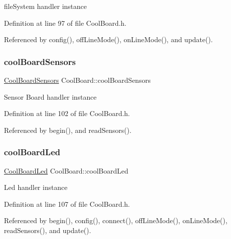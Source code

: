 file\+System handler instance 

Definition at line 97 of file Cool\+Board.\+h.



Referenced by config(), off\+Line\+Mode(), on\+Line\+Mode(), and update().

\mbox{\label{class_cool_board_af102be5288bd7f7a8e59b13f86e26a00}} 
\subsubsection{\texorpdfstring{cool\+Board\+Sensors}{coolBoardSensors}}
{\footnotesize\ttfamily \hyperlink{class_cool_board_sensors}{Cool\+Board\+Sensors} Cool\+Board\+::cool\+Board\+Sensors\hspace{0.3cm}{\ttfamily [private]}}

Sensor Board handler instance 

Definition at line 102 of file Cool\+Board.\+h.



Referenced by begin(), and read\+Sensors().

\mbox{\label{class_cool_board_a1b1d3c684a5baa56b08486e192fd8e97}} 
\subsubsection{\texorpdfstring{cool\+Board\+Led}{coolBoardLed}}
{\footnotesize\ttfamily \hyperlink{class_cool_board_led}{Cool\+Board\+Led} Cool\+Board\+::cool\+Board\+Led\hspace{0.3cm}{\ttfamily [private]}}

Led handler instance 

Definition at line 107 of file Cool\+Board.\+h.



Referenced by begin(), config(), connect(), off\+Line\+Mode(), on\+Line\+Mode(), read\+Sensors(), and update().

\mbox{\label{class_cool_board_a50d2a6716879d64a85f3c6b44ad63275}} 
